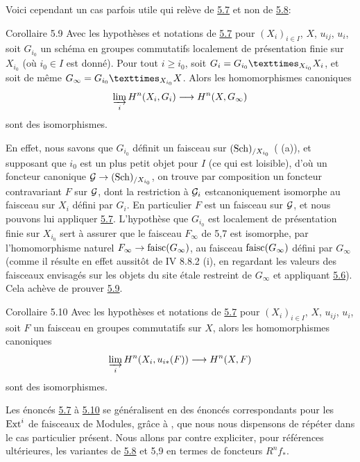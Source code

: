 \documentclass[10pt]{../fichiers-configuration-latex/smfart}
\begin{document}
Voici cependant un cas parfois utile qui relève de \hyperref[VII.thm5.7]{5.7} et non de \hyperref[VII.cor5.8]{5.8}:

\begin{enonce*}{Corollaire 5.9}
Avec les hypothèses et notations de \hyperref[VII.thm5.7]{5.7} pour $(X_i)_{i \in I}$, $X$,
$u_{ij}$, $u_i$, soit $G_{i_0}$ un schéma en groupes commutatifs
localement de présentation finie sur $X_{i_0}$ (où $i_0 \in I$ est
donné). Pour tout $i \geq i_0$, soit $G_i = \fprod{G_{i_0}}{X_i}{X_{i_0}}$,
et soit de même $G_{\infty} = \fprod{G_{i_0}}{X}{X_{i_0}}$. Alors
les homomorphismes canoniques
$$
\varinjlim_i H^n (X_i, G_i) \to H^n (X, G_{\infty})
$$
sont des isomorphismes.
\end{enonce*}

En effet, nous savons que $G_{i_0}$ définit un faisceau sur
$(\operatorname{Sch})_{/X_{i_0}}$ ( (a)), et supposant que $i_0$ est un plus
petit objet pour $I$ (ce qui est loisible), d'où un foncteur
canonique $\Gg \to (\Sch)_{/X_{i_0}}$, on trouve par composition un
foncteur contravariant $F$ sur ${\mathcal G}$, dont la restriction à ${\mathcal G}_i$
est\pageoriginale canoniquement isomorphe au faisceau sur $X_i$
défini par $G_i$. En particulier $F$ est un faisceau sur ${\mathcal G}$, et
nous pouvons lui appliquer \hyperref[VII.thm5.7]{5.7}. L'hypothèse que
$G_{i_0}$ est localement de présentation finie sur $X_{i_0}$ sert à
assurer que le faisceau $F_{\infty}$ de 5,7 est isomorphe, par
l'homomorphisme naturel $F_{\infty} \to \faisc(G_{\infty})$, au
faisceau $\operatorname{faisc}(G_{\infty})$ défini par $G_{\infty}$ (comme il
résulte en effet aussitôt de \EGA IV 8.8.2 (i), en regardant les
valeurs des faisceaux envisagés sur les objets du site étale
restreint de $G_{\infty}$ et appliquant \hyperref[VII.lem5.6]{5.6}). Cela
achève de prouver \hyperref[VII.cor5.9]{5.9}.

\begin{enonce*}{Corollaire 5.10}
Avec les hypothèses et notations de \hyperref[VII.thm5.7]{5.7} pour $(X_i)_{i \in I}$, $X$,
$u_{ij}$, $u_i$, soit $F$ un faisceau en groupes commutatifs
 sur $X$,
alors les homomorphismes canoniques
$$
\varinjlim_{i} H^n (X_i, u_{i\ast} (F)) \to H^n (X, F)
$$
sont des isomorphismes.
\end{enonce*}

Les énoncés \hyperref[VII.thm5.7]{5.7} à \hyperref[VII.cor5.10]{5.10} se généralisent en des énoncés correspondants
pour les $\operatorname{Ext}^i$ de faisceaux de Modules, grâce à , que nous
nous dispensons de répéter dans le cas particulier présent. Nous
allons par contre expliciter, pour références ultérieures, les
variantes de \hyperref[VII.cor5.8]{5.8} et 5,9 en termes de foncteurs $R^n f_{\ast}$.
\end{document}
